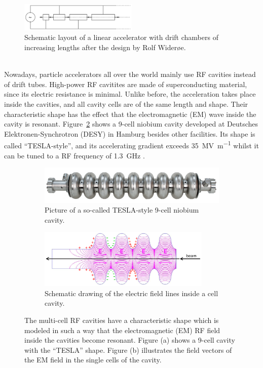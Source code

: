 \begin{figure}
\centering
\includegraphics[width=0.5\textwidth]{Figures/Wideroe_Linac.png}
\caption[Schematic layout of a Wider\o e linac]{Schematic layout of a linear accelerator with drift chambers of increasing lengths after the design by Rolf Wider\o e.~\cite[p. 40]{Hinterberger}}
\label{fig:Wideroe_Linac}
\end{figure}
\\Nowadays, particle accelerators all over the world mainly use RF cavities instead of drift tubes.
High-power RF cavitites are made of superconducting material, since its electric resistance is minimal.
Unlike before, the acceleration takes place inside the cavities, and all cavity cells are of the same length and shape.
Their characteristic shape has the effect that the electromagnetic (EM) wave inside the cavity is resonant.
Figure~\ref{fig:Tesla_Cavity} shows a 9-cell niobium cavity developed at Deutsches Elektronen-Synchrotron (DESY) in Hamburg besides other facilities.
Its shape is called ``TESLA-style'', and its accelerating gradient exceeds \SI{35}{\mega\volt\per\meter} whilst it can be tuned to a RF frequency of \SI{1.3}{\giga\hertz} .~\cite[p. 15f]{TDR31}
\begin{figure}
\begin{subfigure}[b]{0.49\textwidth}
\centering
 \includegraphics[width=\textwidth]{Figures/Tesla_Cavity.jpg}
\caption[Tesla-style 9-cell cavity]{Picture of a so-called TESLA-style 9-cell niobium cavity.~\cite[p. 15]{TDR31}}
\label{fig:Tesla_Cavity}
\end{subfigure}\hfill
\begin{subfigure}[b]{0.49\textwidth}
\centering
 \includegraphics[width=0.9\textwidth]{Figures/Cavity.png}
\caption[Electric field in a cell cavity]{Schematic drawing of the electric field lines inside a cell cavity.~\cite[p. 47]{Desy_SummerStudent_Lecture}}
\label{fig:Cavity}
\end{subfigure}
\caption[RF cavities]{The multi-cell RF cavities have a characteristic shape which is modeled in such a way that the electromagnetic (EM) RF field inside the cavities become resonant. Figure (a) shows a 9-cell cavity with the ``TESLA'' shape. Figure (b) illustrates the field vectors of the EM field in the single cells of the cavity.}
\label{fig:Cavities}
\end{figure}
